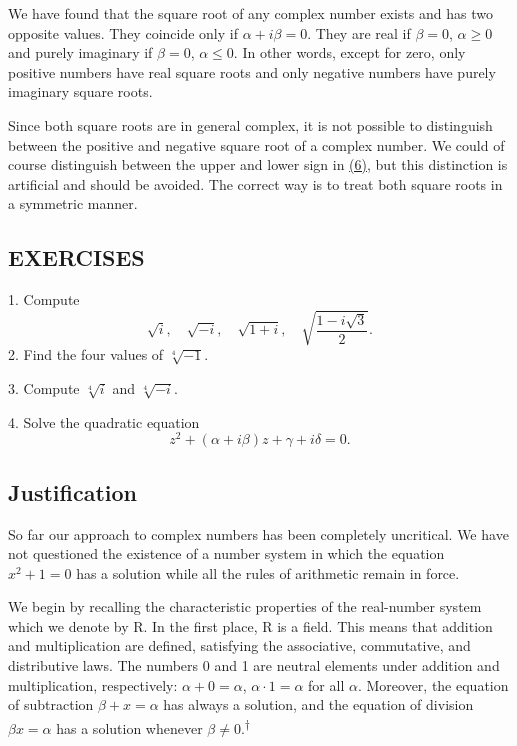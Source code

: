 We have found that the square root of any complex number exists and has two opposite values. They coincide only if $\alpha + i\beta = 0$. They are real if $\beta = 0$, $\alpha \geq 0$ and purely imaginary if $\beta = 0$, $\alpha \leq 0$. In other words, except for zero, only positive numbers have real square roots and only negative numbers have purely imaginary square roots.

Since both square roots are in general complex, it is not possible to distinguish between the positive and negative square root of a complex number. We could of course distinguish between the upper and lower sign in \hyperref[eq:1.6]{(6)}, but this distinction is artificial and should be avoided. The correct way is to treat both square roots in a symmetric manner.

\subsection*{EXERCISES}
1. Compute
\begin{equation*}
\sqrt {i}, \quad \sqrt {- i}, \quad \sqrt {1 + i}, \quad \sqrt {\frac {1 - i \sqrt {3}}{2}}.
\end{equation*}
2. Find the four values of $\sqrt[4]{-1}$.

3. Compute $\sqrt[4]{i}$ and $\sqrt[4]{-i}$.

4. Solve the quadratic equation
\begin{equation*}
z ^ {2} + (\alpha + i \beta) z + \gamma + i \delta = 0.
\end{equation*}
\setcounter{section}{1}\setcounter{subsection}{2}\subsection{Justification}\label{sec:1.1.3}
So far our approach to complex numbers has been completely uncritical. We have not questioned the existence of a number system in which the equation $x^{2} + 1 = 0$ has a solution while all the rules of arithmetic remain in force.

We begin by recalling the characteristic properties of the real-number system which we denote by R. In the first place, R is a field. This means that addition and multiplication are defined, satisfying the associative, commutative, and distributive laws. The numbers 0 and 1 are neutral elements under addition and multiplication, respectively: $\alpha + 0 = \alpha$, $\alpha \cdot 1 = \alpha$ for all $\alpha$. Moreover, the equation of subtraction $\beta + x = \alpha$ has always a solution, and the equation of division $\beta x = \alpha$ has a solution whenever $\beta \neq 0$.\hyperlink{fn:20:dagger}{\textsuperscript{\ensuremath{\dagger}}}

